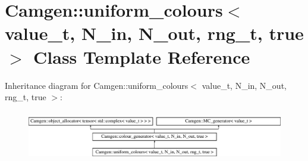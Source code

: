 \hypertarget{a00559}{}\section{Camgen\+:\+:uniform\+\_\+colours$<$ value\+\_\+t, N\+\_\+in, N\+\_\+out, rng\+\_\+t, true $>$ Class Template Reference}
\label{a00559}
Inheritance diagram for Camgen\+:\+:uniform\+\_\+colours$<$ value\+\_\+t, N\+\_\+in, N\+\_\+out, rng\+\_\+t, true $>$\+:\begin{figure}[H]
\begin{center}
\leavevmode
\includegraphics[height=2.222222cm]{a00559}
\end{center}
\end{figure}
